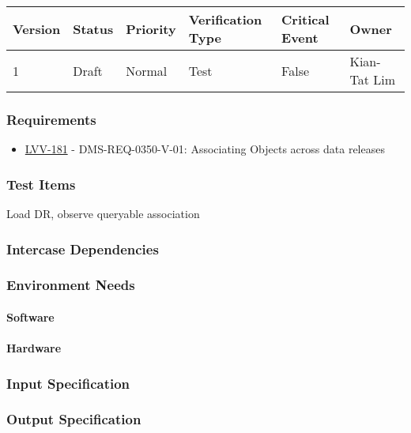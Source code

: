 \begin{longtable}[]{llllll}
\toprule
Version & Status & Priority & Verification Type & Critical Event & Owner
\\\midrule
1 & Draft & Normal &
Test & False & Kian-Tat Lim
\\\bottomrule
\end{longtable}

\subsubsection{Requirements}
\begin{itemize}
\item \href{https://jira.lsstcorp.org/browse/LVV-181}{LVV-181} - DMS-REQ-0350-V-01: Associating Objects across data releases
\end{itemize}

\subsubsection{Test Items}
Load DR, observe queryable association



\subsubsection{Intercase Dependencies}

\subsubsection{Environment Needs}

\paragraph{Software}

\paragraph{Hardware}

\subsubsection{Input Specification}

\subsubsection{Output Specification}

